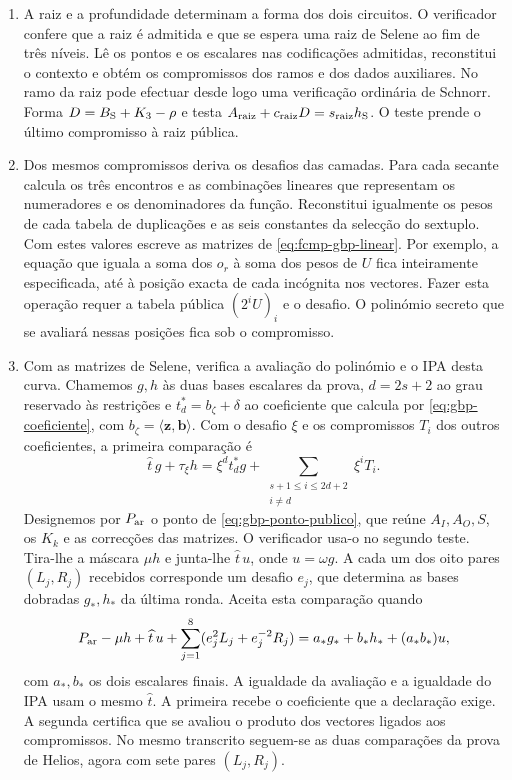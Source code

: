 \begin{enumerate}
\item A raiz e a profundidade determinam a forma dos dois circuitos.
O verificador confere que a raiz é admitida e que se espera uma
raiz de Selene ao fim de três níveis. Lê os pontos e os escalares
nas codificações admitidas, reconstitui o contexto e obtém os
compromissos dos ramos e dos dados auxiliares. No ramo da raiz pode
efectuar desde logo uma verificação ordinária de Schnorr. Forma
\(D=B_{\rm S}+K_3-\rho\) e testa
\(A_{\rm raiz}+c_{\rm raiz}D=s_{\rm raiz}h_{\rm S}\).
O teste prende o último compromisso à raiz pública.

\item Dos mesmos compromissos deriva os desafios das camadas. Para
cada secante calcula os três encontros e as combinações lineares
que representam os numeradores e os denominadores da função.
Reconstitui igualmente os pesos de cada tabela de duplicações
e as seis constantes da selecção do sextuplo. Com estes valores
escreve as matrizes de \eqref{eq:fcmp-gbp-linear}. Por exemplo,
a equação que iguala a soma dos \(o_r\) à soma dos pesos de \(U\)
fica inteiramente especificada, até à posição exacta de cada
incógnita nos vectores. Fazer esta operação requer a tabela
pública \((2^i U)_i\) e o desafio. O polinómio secreto que se
avaliará nessas posições fica sob o compromisso.

\item Com as matrizes de Selene, verifica a avaliação do polinómio
e o IPA desta curva. Chamemos \(g,h\) às duas bases escalares
da prova, \(d=2s+2\) ao grau reservado às restrições e
\(t_d^*=b_\zeta+\delta\) ao coeficiente que calcula por
\eqref{eq:gbp-coeficiente}, com
\(b_\zeta=\langle\boldsymbol z,\boldsymbol b\rangle\). Com o
desafio \(\xi\) e os compromissos \(T_i\) dos outros
coeficientes, a primeira comparação é
\[
  \widehat t\,g+\tau_\xi h
  =\xi^d t_d^*g+\sum_{\substack{s+1\leq i\leq2d+2\\i\ne d}}\xi^iT_i.
\]
Designemos por \(P_{\rm ar}\) o ponto de \eqref{eq:gbp-ponto-publico},
que reúne \(A_I,A_O,S\), os \(K_k\) e as correcções das matrizes.
O verificador usa-o no segundo teste. Tira-lhe
a máscara \(\mu h\) e junta-lhe \(\widehat t\,u\), onde
\(u=\omega g\). A cada um dos oito pares \((L_j,R_j)\) recebidos
corresponde um desafio \(e_j\), que determina as bases dobradas
\(g_*,h_*\) da última ronda. Aceita esta comparação quando
\[
 P_{\rm ar}-\mu h+\widehat t\,u+
    \sum_{j=1}^{8}(e_j^2L_j+e_j^{-2}R_j)
       =a_* g_*+b_* h_*+(a_*b_*)u ,
\]
com \(a_*,b_*\) os dois escalares finais. A igualdade da avaliação
e a igualdade do IPA usam o mesmo \(\widehat t\). A primeira
recebe o coeficiente que a declaração exige. A segunda certifica
que se avaliou o produto dos vectores ligados aos compromissos.
No mesmo transcrito seguem-se as duas comparações da prova de
Helios, agora com sete pares \((L_j,R_j)\).


\end{enumerate}
